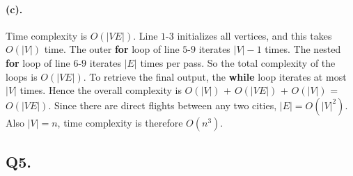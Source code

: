 \documentclass[12pt]{article}
\begin{document}
\paragraph{(c).}
Time complexity is \(O(|VE|)\). Line \(1\text{-}3\) initializes all vertices, and this takes \(O(|V|)\) time. The outer \textbf{for} loop of line \(5\text{-}9\) iterates \(|V|-1\) times. The nested \textbf{for} loop of line \(6\text{-}9\) iterates \(|E|\) times per pass. So the total complexity of the loops is \(O(|VE|)\). To retrieve the final output, the \textbf{while} loop iterates at most \(|V|\) times. Hence the overall complexity is \(O(|V|)\) + \(O(|VE|)\) + \(O(|V|)\) = \(O(|VE|)\). Since there are direct flights between any two cities, \(|E| = O(|V|^2)\). Also \(|V| = n\), time complexity is therefore \(O(n^3)\).

\subsection*{Q5.}
\end{document}
